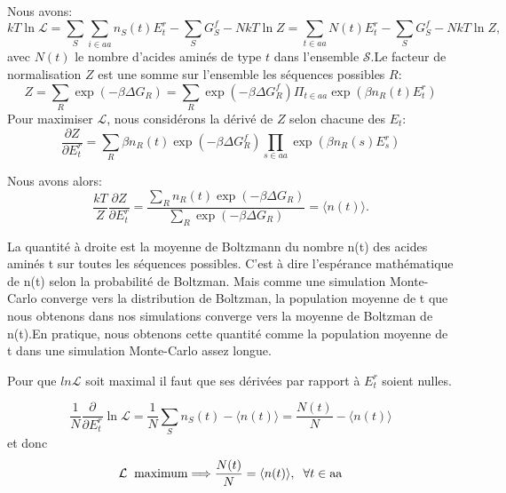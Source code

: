 Nous avons:
\begin{equation}
kT \ln \mathcal{L} = \sum_S\sum_{i \in aa} n_S(t) E^r_t - \sum_S G^f_S - N kT \ln Z = \sum_{t \in aa} N(t) E^r_t - \sum_S G^f_S - N kT \ln Z,
\end{equation}
avec $N(t)$ le nombre d'acides aminés de type $t$ dans l'ensemble $\mathcal{S}$.Le facteur de normalisation $Z$ est une somme sur l'ensemble les séquences possibles $R$:
\begin{equation}
  Z=\sum_R \exp(-\beta \Delta G_R) = \sum_R \exp(-\beta\Delta G^f_R)\Pi_{t\in aa}\exp(\beta n_R (t) E^r_t)
\end{equation} 
Pour maximiser $\mathcal{L}$, nous considérons la dérivé de $Z$ selon chacune des $E_t$:
\begin{equation}
\frac{ \partial Z }{ \partial E^r_t } = 
   \sum_R \beta n_R(t) \exp (-\beta \Delta G^f_R) \prod_{s \in aa} \exp(\beta n_R(s) E^r_s) 
\end{equation}

Nous avons alors:
\begin{equation}
\frac{kT}{Z} \frac{ \partial Z }{ \partial E^r_t }
   = \frac{ \sum_R n_R(t) \exp(-\beta \Delta G_R) }{ \sum_R \exp(-\beta \Delta G_R) } = \langle n(t) \rangle.
\end{equation}

La quantité à droite est la moyenne de Boltzmann du nombre n(t) des acides aminés t sur toutes les séquences possibles. C'est à dire l'espérance mathématique de n(t) selon la probabilité de Boltzman. Mais comme une simulation Monte-Carlo converge vers la distribution de Boltzman, la population moyenne de t que nous obtenons dans nos simulations converge vers la moyenne de Boltzman de n(t).En pratique, nous obtenons cette quantité comme la population moyenne de t dans une simulation Monte-Carlo assez longue. 

Pour que $ln \mathcal{L}$ soit maximal il faut que ses dérivées par rapport à $E_t^r$ soient nulles.

\begin{equation}
\frac{1}{N} \frac{\partial}{\partial E^r_t} \ln {\mathcal L} = \frac{1}{N} \sum_S n_S(t) - \langle n(t) \rangle 
   = \frac{N(t)}{N} - \langle n(t) \rangle
\end{equation}
et donc
\begin{displaymath}
{\mathcal L} \hspace*{2mm} {\rm maximum} \Longrightarrow \frac{N(t)}{N} = \langle n(t) \rangle, 
\hspace*{2mm} \forall t \in {\rm aa}
\label{eq:optimum}
\end{displaymath}

